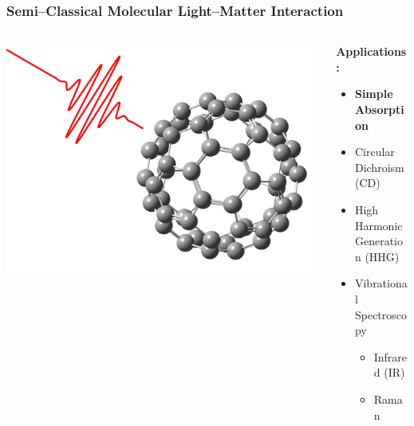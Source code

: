 \documentclass{beamer}
\begin{document}
\begin{frame}
\frametitle{Semi--Classical Molecular Light--Matter Interaction}
\begin{columns}
\begin{column}{0.5\textwidth}
\includegraphics[width=\textwidth]{BMF_pulse}
\end{column}
\begin{column}{0.5\textwidth}
\textbf{Applications:}
\begin{itemize}
  \item \textbf{Simple Absorption}
  \item Circular Dichroism (CD)
  \item High Harmonic Generation (HHG)
  \item Vibrational Spectroscopy
  \begin{itemize}
    \item Infrared (IR)
    \item Raman
  \end{itemize}
\end{itemize}
\end{column}
\end{columns}
\end{frame}
\end{document}
